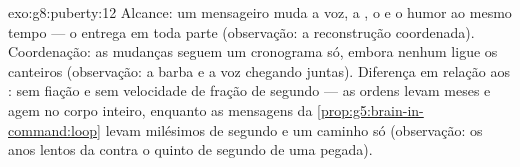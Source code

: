 \begin{solution}{exo:g8:puberty:12}
Alcance: um mensageiro muda a voz, a , o  e o humor ao
mesmo tempo --- o  entrega em toda parte (observação: a
reconstrução coordenada). Coordenação: as mudanças seguem um
cronograma só, embora  nenhum ligue os canteiros (observação: a
barba e a voz chegando juntas). Diferença em relação aos : sem
fiação e sem velocidade de fração de segundo --- as ordens levam meses e
agem no corpo inteiro, enquanto as mensagens da
\cref{prop:g5:brain-in-command:loop} levam milésimos de segundo e um
caminho só (observação: os anos lentos da  contra o quinto de
segundo de uma pegada).
\end{solution}

